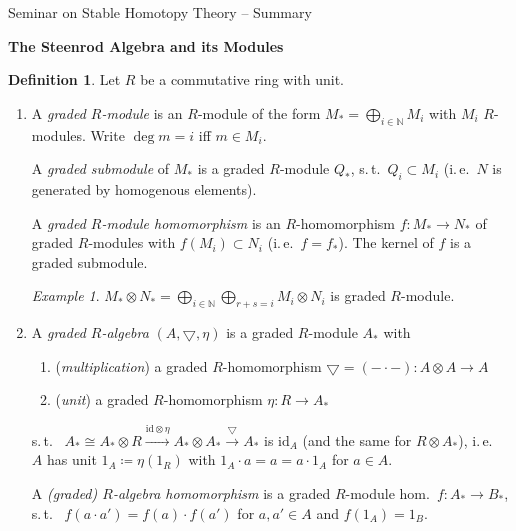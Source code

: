 \documentclass[english]{scrartcl}
\theoremstyle{definition}
\newtheorem*{Def}{Definition}
\theoremstyle{remark}
\newtheorem*{Ex}{Example}
\newcommand*{\idest}{i.\,e.\ }
\newcommand*{\suchthat}{s.\,t.\ }
\newcommand*{\N}{\mathds{N}}
\newcommand*{\id}{\text{id}}
\newcommand*{\mult}{\bigtriangledown} %
\newcommand*{\unit}{\eta} %
\newcommand*{\one}[1]{1_{#1}} %
\begin{document}
\clearpairofpagestyles
{}
\cfoot*{\pagemark}

\begin{center}
  Seminar on Stable Homotopy Theory – Summary

  \medskip
  {\Large\bfseries The Steenrod Algebra and its Modules}
\end{center}
\smallskip

\begin{Def}
  Let $R$ be a commutative ring with unit.
  \begin{enumerate}[label=(\arabic*), parsep=0pt, listparindent=\parindent]
  \item A \emph{graded $R$-module} is an $R$-module of the form
    $M_*=\bigoplus_{i\in\N} M_i$ with $M_i$ $R$-modules.
    Write $\deg m = i$ iff $m\in M_i$.

    A \emph{graded submodule} of $M_*$ is a graded $R$-module $Q_*$,
    \suchthat $Q_i\subset M_i$
    (\idest $N$ is generated by homogenous elements).

    A \emph{graded $R$-module homomorphism} is an $R$-homomorphism $f\colon
    M_*\to N_*$ of graded $R$-modules with $f(M_i)\subset N_i$
    (\idest $f=f_*$).
    The kernel of $f$ is a graded submodule.

    \begin{Ex}
      $M_*\otimes N_* = \bigoplus_{i\in\N}\bigoplus_{r+s=i}
      M_i\otimes N_i$ is graded $R$-module.
    \end{Ex}
  \item\label{def:algebra}
    A \emph{graded $R$-algebra} $(A,\mult,\unit)$ is a graded
    $R$-module $A_*$ with
    \begin{enumerate}
    \item (\emph{multiplication}) a graded $R$-homomorphism
      $\mult=(-\cdot-)\colon A\otimes A\to A$
    \item (\emph{unit}) a graded $R$-homomorphism
      $\unit\colon R\to A_*$
    \end{enumerate}
    \suchthat
    $A_*\cong A_*\otimes R
    \xrightarrow{\id\otimes\unit} A_*\otimes A_*
    \xrightarrow{\mult} A_*$ is $\id_A$ (and the same for $R\otimes
    A_*$),
    \idest
    $A$ has unit $\one{A}\coloneqq \unit(1_R)$
    with $\one{A}\cdot a=a=a\cdot\one{A}$ for $a\in A$.

    A \emph{(graded) $R$-algebra homomorphism} is a graded $R$-module
    hom.\  ${f\colon A_*\to B_*}$, \suchthat
    $f(a\cdot a') = f(a)\cdot f(a')$ for $a,a'\in A$ and $f(\one{A})=\one{B}$.


\end{enumerate}
\end{Def}
\end{document}

